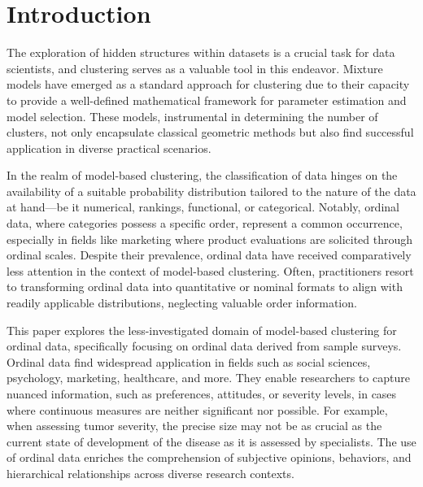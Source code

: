 
\section{Introduction}
The exploration of hidden structures within datasets is a crucial task for data scientists, and clustering serves as a valuable tool in this endeavor. Mixture models have emerged as a standard approach for clustering due to their capacity to provide a well-defined mathematical framework for parameter estimation and model selection. These models, instrumental in determining the number of clusters, not only encapsulate classical geometric methods but also find successful application in diverse practical scenarios.

In the realm of model-based clustering, the classification of data hinges on the availability of a suitable probability distribution tailored to the nature of the data at hand—be it numerical, rankings, functional, or categorical. Notably, ordinal data, where categories possess a specific order, represent a common occurrence, especially in fields like marketing where product evaluations are solicited through ordinal scales. Despite their prevalence, ordinal data have received comparatively less attention in the context of model-based clustering. Often, practitioners resort to transforming ordinal data into quantitative or nominal formats to align with readily applicable distributions, neglecting valuable order information.

This paper explores the less-investigated domain of model-based clustering for ordinal data, specifically focusing on ordinal data derived from sample surveys. Ordinal data find widespread application in fields such as social sciences, psychology, marketing, healthcare, and more. They enable researchers to capture nuanced information, such as preferences, attitudes, or severity levels, in cases where continuous measures are neither significant nor possible. For example, when assessing tumor severity, the precise size may not be as crucial as the current state of development of the disease as it is assessed by specialists. The use of ordinal data enriches the comprehension of subjective opinions, behaviors, and hierarchical relationships across diverse research contexts. 

